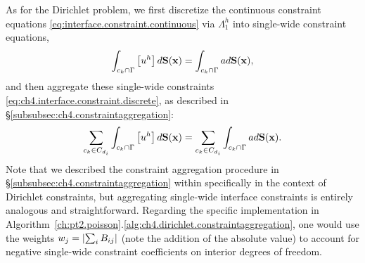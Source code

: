 As for the Dirichlet problem, we first discretize the continuous constraint equations \eqref{eq:interface.constraint.continuous} via $\Lambda^h_1$ into single-wide constraint equations,
\begin{equation} \label{eq:ch4.interface.constraint.discrete}
\int_{c_k \cap \Gamma} \left[ u^h \right] d\mathbf{S}(\mathbf{x}) = \int_{c_k \cap \Gamma} a d\mathbf{S}(\mathbf{x}),
\end{equation}
and then aggregate these single-wide constraints \eqref{eq:ch4.interface.constraint.discrete}, as described in \S\ref{subsubsec:ch4.constraintaggregation}:
\begin{equation} \label{eq:ch4.interface.aggregateconstraint}
\sum_{c_k \in C_{d_i}} \int_{c_k \cap \Gamma} \left[ u^h \right] d\mathbf{S}(\mathbf{x}) = \sum_{c_k \in C_{d_i}} \int_{c_k \cap \Gamma} a d\mathbf{S}(\mathbf{x}).
\end{equation}
Note that we described the constraint aggregation procedure in \S\ref{subsubsec:ch4.constraintaggregation} within specifically in the context of Dirichlet constraints, but aggregating single-wide interface constraints is entirely analogous and straightforward. Regarding the specific implementation in Algorithm~\ref{ch:pt2.poisson}.\ref{alg:ch4.dirichlet.constraintaggregation}, one would use the weights $w_j = \left\lvert \sum_i B_{ij} \right\rvert$ (note the addition of the absolute value) to account for negative single-wide constraint coefficients on interior degrees of freedom.

